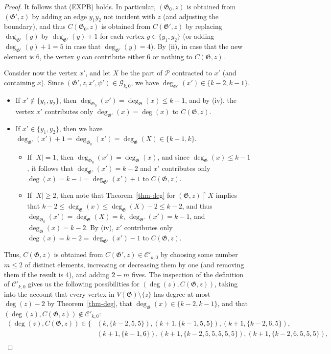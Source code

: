 \documentclass{article}
\newcommand{\PP}{\mathcal{P}}
\newcommand{\GG}{\mathcal{G}}
\newcommand{\CC}{\mathcal{C}}
\newcommand\g{\mathfrak{G}}
\begin{document}
\begin{proof}
It follows that (EXPB) holds. In particular, $(\g_0,z)$ is obtained from $(\g',z)$ by adding an edge $y_1y_2$ not incident with $z$ (and adjusting the boundary),
and thus $C(\g_0,z)$ is obtained from $C(\g',z)$ by replacing $\deg_{\g'}(y)$ by $\deg_{\g'}(y)+1$ for each vertex $y\in \{y_1,y_2\}$
(or adding $\deg_{\g'}(y)+1=5$ in case that $\deg_{\g'}(y)=4$).  By (ii), in case that the new element is $6$, the vertex $y$ can contribute either
$6$ or nothing to $C(\g,z)$.

Consider now the vertex $x'$, and let $X$ be the part of $\PP$ contracted to $x'$ (and containing $x$).
Since $(\g',z,x',\psi')\in\GG_{k,0}$, we have $\deg_{\g'}(x')\in\{k-2,k-1\}$.
\begin{itemize}
\item If $x'\not\in \{y_1,y_2\}$, then $\deg_{\g_0}(x')=\deg_{\g}(x)\le k-1$, and by (iv),
the vertex $x'$ contributes only $\deg_{\g'}(x)=\deg(x)$ to $C(\g,z)$.
\item If $x'\in \{y_1,y_2\}$, then we have $\deg_{\g'}(x')+1=\deg_{\g_0}(x')=\deg_{\g}(X)\in\{k-1,k\}$.
\begin{itemize}
\item If $|X|=1$, then $\deg_{\g_0}(x')=\deg_{\g}(x)$, and since $\deg_{\g}(x)\le k-1$,
it follows that $\deg_{\g'}(x')=k-2$ and $x'$ contributes only $\deg(x)=k-1=\deg_{\g'}(x')+1$ to $C(\g,z)$.
\item If $|X|\ge 2$, then note that Theorem~\ref{thm-deg} for $(\g,z)\restriction X$ implies that
$k-2\le \deg_{\g}(x)\le \deg_{\g}(X)-2\le k-2$, and thus
$\deg_{\g_0}(x')=\deg_{\g}(X)=k$, $\deg_{\g'}(x')=k-1$, and $\deg_{\g}(x)=k-2$.  By (iv), $x'$ contributes only $\deg(x)=k-2=\deg_{\g'}(x')-1$ to $C(\g,z)$.
\end{itemize}
\end{itemize}
Thus, $C(\g,z)$ is obtained from $C(\g',z)\in \CC'_{k,0}$ by choosing some number $m\le 2$ of distinct elements,
increasing or decreasing them by one (and removing them if the result is $4$), and adding $2-m$ fives.
The inspection of the definition of $\CC'_{k,0}$ gives us the following possibilities for $(\deg(z),C(\g,z))$,
taking into the account that every vertex in $V(\g)\setminus\{z\}$ has degree
at most $\deg(z)-2$ by Theorem~\ref{thm-deg}, that $\deg_{\g}(x)\in \{k-2,k-1\}$, and that $(\deg(z),C(\g,z))\not\in \CC'_{k,0}$:
\begin{align*}
(\deg(z),C(\g,z))\in\{&(k,\{k-2,5,5\}),(k+1,\{k-1,5,5\}), (k+1,\{k-2,6,5\}),\\
&(k+1,\{k-1,6\}), (k+1,\{k-2,5,5,5,5,5\}), (k+1,\{k-2,6,5,5,5\}),\\

\end{align*}
\end{proof}
\end{document}
